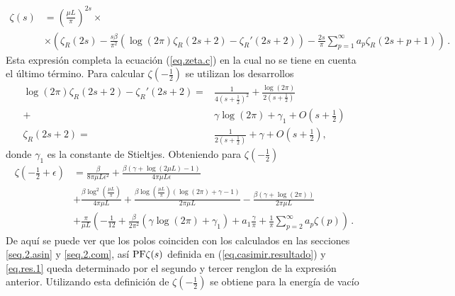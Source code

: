 \begin{align}
\zeta (s) &= \left( \frac{\mu L}{\pi} \right) ^{2s} \times \\
			\nonumber
			&\times
			\left(
					\zeta _R (2s) - \frac{s \beta}{\pi ^2} 
						\left(
							\log (2 \pi ) \zeta _R (2s+2) - \zeta _R '(2s+2)
							\right)-
					\frac{2 s}{\pi} \sum _{p=1} ^{\infty}
						a _p \zeta _R (2s+p+1)
					\right)
\, .					
\end{align}
Esta expresión completa la ecuación (\ref{eq.zeta.c}) en  la cual no se tiene en cuenta el último término.
Para calcular $\zeta \left( - \frac{1}{2} \right)$ se utilizan los desarrollos
\begin{align}\label{cortar}
	\log (2 \pi) \zeta _R (2s+2) -
	\zeta _R ' (2s+2) = & 
	\frac{1}{4 \left( s + \frac{1}{2} \right) ^2} + 
	\frac{ \log (2 \pi ) }{2 \left( s + \frac{1}{2} \right) } 
\\ \nonumber
	+ &  \gamma \log (2 \pi ) + \gamma _1 + O \left( s + \frac{1}{2} \right) \\
	\zeta _R (2s+2) = &\frac{1}{2 \left( s + \frac{1}{2} \right)} + \gamma + O \left( s + \frac{1}{2} \right)
	 ,
\end{align}
donde $\gamma _1$ es la constante de Stieltjes. Obteniendo para $\zeta \left( - \frac{1}{2} \right) $
\begin{align}\label{eq.zeta.final}
\zeta \left( - \frac{1}{2} + \epsilon \right) &=
		\frac{\beta}{8  \pi \mu L \epsilon ^2}	 +
	    \frac{
	    	\beta ( \gamma  +  \log (2 \mu L ) -1 ) }
	    	{4  \pi \mu L \epsilon } 
\\[5pt]
\nonumber
&
+
		\frac{\beta \log ^2 \left( \frac{\mu L}{\pi} \right)}{4 \pi \mu L}  +
		\frac{
			\beta \log \left( \frac{\mu L}{\pi}\right)
				( \log (2 \pi ) + \gamma -1)}
			{2 \pi \mu L}  
- \frac{\beta (\gamma + \log(2 \pi) )}{2 \pi \mu L}
\\[5pt]
\nonumber
&
+
\frac{\pi}{\mu L}  
					\left(
							- \frac{1}{12} +
							\frac{\beta}{2 \pi ^2} \left(
														\gamma \log (2 \pi)
														+ \gamma _1
														\right) +
								a _1 \frac{\gamma}{\pi} +
								\frac{1}{\pi} \sum _{p=2} ^{\infty}
								a_p \zeta (p) 
							\right) 
\, .
\end{align}
De aquí se puede ver que los polos coinciden con los calculados en las secciones \ref{seq.2.asin} y \ref{seq.2.com}, así ${\rm PF} \zeta (s)$ definida en (\ref{eq.casimir.resultado}) y \eqref{eq.res.1} queda determinado por el segundo y tercer renglon de la expresión anterior. 
Utilizando esta definición de $\zeta \left( - \frac{1}{2} \right) $ se obtiene para la energía de vacío
